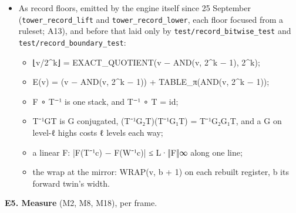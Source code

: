 \begin{itemize}
\begin{itemize}
\item Matching on a floor (25 September: “say we want to find x and x is on floor 2, we have the knf, we only need to \&\&“). Floor 2 of a 64³ frame is its 16³ corner after two levels, m = n/64 values. Laid once as 16 bit planes, it gives every position holding x as ∧\_\allowbreak{}j (x\_\allowbreak{}j ? P\_\allowbreak{}j : ¬P\_\allowbreak{}j), 32 positions a word, reading no value and at most 16m/32 = n/128 plane words; a word stops once its mask is empty. \textbf{Proved} (\texttt{floor\_\allowbreak{}match}, 11 checks, 0 failed, \texttt{build/\allowbreak{}20260925\_\allowbreak{}015942\_\allowbreak{}sim\_\allowbreak{}floor\_\allowbreak{}match}): the engine's floor 2, the crystal's corner lowered as its own tower, equals the host's two-level lifting at 4,096 of 4,096; 1,024 values on floor 2 and 1,024 not, every match set equal to the host's scan; the most any query read was 1,340 plane words, against n/2 = 131,072 samples. The index costs one read of a, the lift, paid once.
\end{itemize}
\item As record floors, emitted by the engine itself since 25 September (\texttt{tower\_\allowbreak{}record\_\allowbreak{}lift} and \texttt{tower\_\allowbreak{}record\_\allowbreak{}lower}, each floor focused from a ruleset; A13), and before that laid only by \texttt{test/\allowbreak{}record\_\allowbreak{}bitwise\_\allowbreak{}test} and \texttt{test/\allowbreak{}record\_\allowbreak{}boundary\_\allowbreak{}test}:

\begin{itemize}
\item ⌊v/2\textasciicircum{}k⌋ = EXACT\_\allowbreak{}QUOTIENT(v − AND(v, 2\textasciicircum{}k − 1), 2\textasciicircum{}k);
\item E(v) = (v − AND(v, 2\textasciicircum{}k − 1)) + TABLE\_\allowbreak{}π(AND(v, 2\textasciicircum{}k − 1));
\item F ∘ T⁻¹ is one stack, and T⁻¹ ∘ T = id;
\item T⁻¹GT is G conjugated, (T⁻¹G₂T)(T⁻¹G₁T) = T⁻¹G₂G₁T, and a G on level-ℓ highs costs ℓ levels each way;
\item a linear F: |F(T⁻¹c) − F(W⁻¹c)| ≤ L·‖F‖∞ along one line;
\item the wrap at the mirror: WRAP(v, b + 1) on each rebuilt register, b its forward twin's width.
\end{itemize}
\end{itemize}

\textbf{E5. Measure} (M2, M8, M18), per frame.

